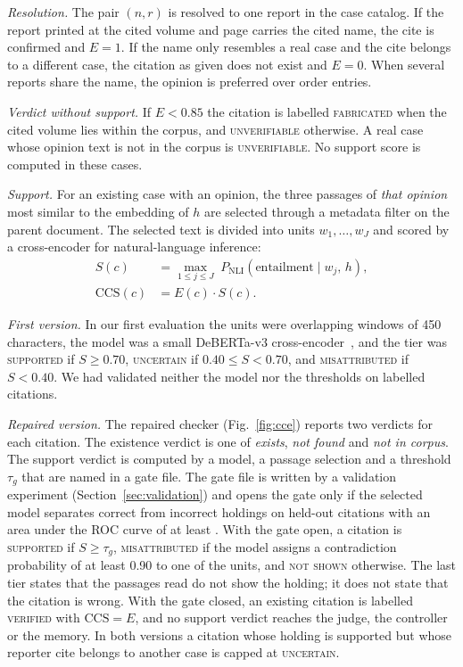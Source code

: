 \documentclass[conference]{IEEEtran}
\begin{document}
\emph{Resolution.} The pair $(n, r)$ is resolved to one report in the case catalog. If the report printed at the cited volume and page carries the cited name, the cite is confirmed and $E = 1$. If the name only resembles a real case and the cite belongs to a different case, the citation as given does not exist and $E = 0$. When several reports share the name, the opinion is preferred over order entries.

\emph{Verdict without support.} If $E < 0.85$ the citation is labelled \textsc{fabricated} when the cited volume lies within the corpus, and \textsc{unverifiable} otherwise. A real case whose opinion text is not in the corpus is \textsc{unverifiable}. No support score is computed in these cases.

\emph{Support.} For an existing case with an opinion, the three passages of \emph{that opinion} most similar to the embedding of $h$ are selected through a metadata filter on the parent document. The selected text is divided into units $w_1,\dots,w_J$ and scored by a cross-encoder for natural-language inference:
\begin{align}
S(c) &= \max_{1 \leq j \leq J} \; P_{\mathrm{NLI}}\!\left(\text{entailment} \mid w_j,\, h\right), \\
\mathrm{CCS}(c) &= E(c) \cdot S(c).
\end{align}

\emph{First version.} In our first evaluation the units were overlapping windows of 450 characters, the model was a small DeBERTa-v3 cross-encoder~\cite{debertav3}, and the tier was \textsc{supported} if $S \geq 0.70$, \textsc{uncertain} if $0.40 \leq S < 0.70$, and \textsc{misattributed} if $S < 0.40$. We had validated neither the model nor the thresholds on labelled citations.

\emph{Repaired version.} The repaired checker (Fig.~\ref{fig:cce}) reports two verdicts for each citation. The existence verdict is one of \emph{exists}, \emph{not found} and \emph{not in corpus}. The support verdict is computed by a model, a passage selection and a threshold $\tau_g$ that are named in a gate file. The gate file is written by a validation experiment (Section~\ref{sec:validation}) and opens the gate only if the selected model separates correct from incorrect holdings on held-out citations with an area under the ROC curve of at least \ResGateRequiredAUC. With the gate open, a citation is \textsc{supported} if $S \geq \tau_g$, \textsc{misattributed} if the model assigns a contradiction probability of at least 0.90 to one of the units, and \textsc{not shown} otherwise. The last tier states that the passages read do not show the holding; it does not state that the citation is wrong. With the gate closed, an existing citation is labelled \textsc{verified} with $\mathrm{CCS} = E$, and no support verdict reaches the judge, the controller or the memory. In both versions a citation whose holding is supported but whose reporter cite belongs to another case is capped at \textsc{uncertain}.
\end{document}
